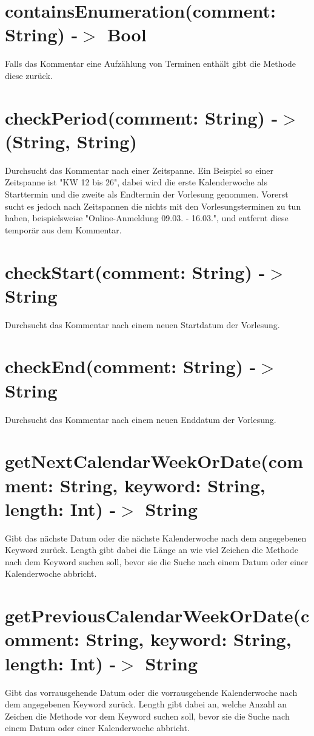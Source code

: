 \section{containsEnumeration(comment: String) -$>$ Bool}
Falls das Kommentar eine Aufzählung von Terminen enthält gibt die Methode diese zurück.

\section{checkPeriod(comment: String) -$>$ (String, String)}
Durchsucht das Kommentar nach einer Zeitspanne. Ein Beispiel so einer Zeitspanne ist "KW 12 bis 26", dabei wird die erste Kalenderwoche als Starttermin und die zweite als Endtermin der Vorlesung genommen. Vorerst sucht es jedoch nach Zeitspannen die nichts mit den Vorlesungsterminen zu tun haben, beispielsweise "Online-Anmeldung 09.03. - 16.03.", und entfernt diese temporär aus dem Kommentar.

\section{checkStart(comment: String) -$>$ String}
Durchsucht das Kommentar nach einem neuen Startdatum der Vorlesung.

\section{checkEnd(comment: String) -$>$ String}
Durchsucht das Kommentar nach einem neuen Enddatum der Vorlesung.

\section{getNextCalendarWeekOrDate(comment: String, keyword: String, length: Int) -$>$ String}
Gibt das nächste Datum oder die nächste Kalenderwoche nach dem angegebenen Keyword zurück. Length gibt dabei die Länge an wie viel Zeichen die Methode nach dem Keyword suchen soll, bevor sie die Suche nach einem Datum oder einer Kalenderwoche abbricht.

\section{getPreviousCalendarWeekOrDate(comment: String, keyword: String, length: Int) -$>$ String}
Gibt das vorrausgehende Datum oder die vorrausgehende Kalenderwoche nach dem angegebenen Keyword zurück. Length gibt dabei an, welche Anzahl an Zeichen die Methode vor dem Keyword suchen soll, bevor sie die Suche nach einem Datum oder einer Kalenderwoche abbricht.